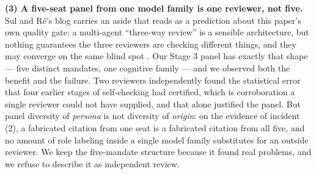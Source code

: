 \documentclass[
  11pt,
]{article}
\begin{document}
\textbf{(3) A five-seat panel from one model family is one reviewer, not five.} Sul and Ré's blog carries an aside that reads as a prediction about this paper's own quality gate: a multi-agent ``three-way review'' is a sensible architecture, but nothing guarantees the three reviewers are checking different things, and they may converge on the same blind spot \cite{retire36}. Our Stage 3 panel has exactly that shape --- five distinct mandates, one cognitive family --- and we observed both the benefit and the failure. Two reviewers independently found the statistical error that four earlier stages of self-checking had certified, which is corroboration a single reviewer could not have supplied, and that alone justified the panel. But panel diversity of \emph{persona} is not diversity of \emph{origin}: on the evidence of incident (2), a fabricated citation from one seat is a fabricated citation from all five, and no amount of role labeling inside a single model family substitutes for an outside reviewer. We keep the five-mandate structure because it found real problems, and we refuse to describe it as independent review.

  
\end{document}
